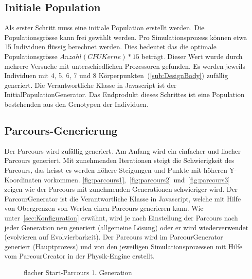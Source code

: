     \subsection{Initiale Population\label{sec:initPop}}

      Als erster Schritt muss eine initiale Population erstellt werden. Die Populationsgrösse kann frei gewählt werden.
      Pro Simulationsprozess können etwa 15 Individuen flüssig berechnet werden.
      Dies bedeutet das die optimale Populationsgrösse  \( Anzahl(CPU Kerne) * 15 \) beträgt.
      Dieser Wert wurde durch mehrere Versuche mit unterschiedlichen Prozessoren gefunden.
      Es werden jeweils Individuen mit 4, 5, 6, 7 und 8 Körperpunkten~(\vref{sub:DesignBody}) zufällig generiert.
      Die Verantwortliche Klasse in Javascript ist der InitialPopulationGenerator.
      Das Endprodukt dieses Schrittes ist eine Population bestehenden aus den Genotypen der Individuen.

    \subsection{Parcours-Generierung\label{sec:Parcour Generierung}}

      Der Parcours wird zufällig generiert. Am Anfang wird ein einfacher und flacher Parcours generiert.
      Mit zunehmenden Iterationen steigt die Schwierigkeit des Parcours,
      das heisst es werden höhere Steigungen und Punkte mit höheren Y-Koordinaten vorkommen.
      \vref{fig:parcours1},~\vref{fig:parcours2} und~\vref{fig:parcours3} zeigen
      wie der Parcours mit zunehmenden Generationen schwieriger wird.
      Der ParcourGenerator ist die Verantwortliche Klasse in Javascript,
      welche mit Hilfe von Obergrenzen von Werten einen Parcours generieren kann.
      Wie unter~\ref{sec:Konfiguration} erwähnt,
      wird je nach Einstellung der Parcours nach jeder Generation neu generiert (allgemeine Lösung) oder
      er wird wiederverwendet (evolvieren auf Evolvierbarkeit).
      Der Parcours wird im ParcourGenerator generiert (Hauptprozess) und
      von den jeweiligen Simulationsprozessen mit Hilfe vom ParcourCreator in der Physik-Engine erstellt.

      \vspace{1cm}

      \begin{figure}[H]
        \centering
        
        \caption{flacher Start-Parcours 1. Generation\label{fig:parcours1}}
      \end{figure}

